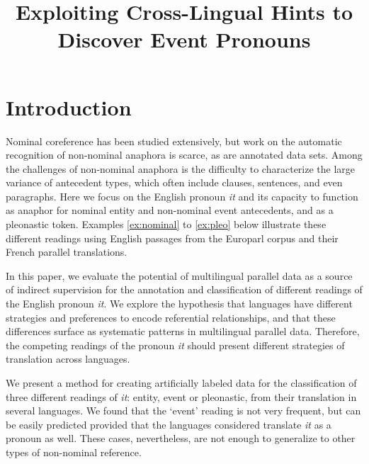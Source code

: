 \documentclass[10pt, a4paper]{article}
\title{Exploiting Cross-Lingual Hints to Discover Event Pronouns}
\begin{document}
\maketitleabstract

\section{Introduction}

\renewcommand{\thefootnote}{\fnsymbol{footnote}}


Nominal coreference has been studied extensively, but work on the automatic 
recognition of non-nominal anaphora is scarce, as are annotated data sets. Among 
the challenges of non-nominal anaphora is the difficulty to characterize the 
large variance of antecedent types, which often include clauses, sentences, and 
even paragraphs. Here we focus on the English pronoun \textit{it} and its 
capacity to function as anaphor for nominal entity and non-nominal event 
antecedents, and as a pleonastic token. Examples \ref{ex:nominal} to 
\ref{ex:pleo} below illustrate these different readings using English passages 
from the Europarl corpus and their French parallel translations.


In this paper, we evaluate the potential of multilingual parallel data as a 
source of indirect supervision for the annotation and classification of 
different readings of the English 
pronoun \textit{it}. We explore the hypothesis that languages have different 
strategies and preferences to encode referential relationships, and that these 
differences surface as systematic patterns in multilingual parallel data. 
Therefore, the competing readings of the pronoun \textit{it} should present 
different strategies of translation across languages.  

We present a method for creating artificially labeled data for the 
classification of three different readings of \textit{it}: entity, event or 
pleonastic, from their translation in several languages. We found that the 
`event' reading is not very frequent, but can be easily predicted provided that 
the languages considered translate \textit{it} as a pronoun as well. These 
cases, nevertheless, are not enough to generalize to other types of non-nominal 
reference. %
\end{document}
